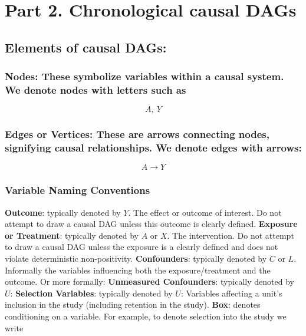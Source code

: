 \documentclass[
  singlecolumn]{report}
\begin{document}
\hypertarget{part-2.-chronological-causal-dags}{%
\section{Part 2. Chronological causal
DAGs}\label{part-2.-chronological-causal-dags}}

\hypertarget{elements-of-causal-dags}{%
\subsection{Elements of causal DAGs:}\label{elements-of-causal-dags}}

\hypertarget{nodes-these-symbolize-variables-within-a-causal-system.-we-denote-nodes-with-letters-such-as}{%
\subsubsection{\texorpdfstring{\textbf{Nodes:} These symbolize variables
within a causal system. We denote nodes with letters such
as}{Nodes: These symbolize variables within a causal system. We denote nodes with letters such as}}\label{nodes-these-symbolize-variables-within-a-causal-system.-we-denote-nodes-with-letters-such-as}}

\[
A, ~ Y
\]

\hypertarget{edges-or-vertices-these-are-arrows-connecting-nodes-signifying-causal-relationships.-we-denote-edges-with-arrows}{%
\subsubsection{\texorpdfstring{\textbf{Edges or Vertices:} These are
arrows connecting nodes, signifying causal relationships. We denote
edges with
arrows:}{Edges or Vertices: These are arrows connecting nodes, signifying causal relationships. We denote edges with arrows:}}\label{edges-or-vertices-these-are-arrows-connecting-nodes-signifying-causal-relationships.-we-denote-edges-with-arrows}}

\[
   A \to Y
\]

\hypertarget{variable-naming-conventions}{%
\subsubsection{\texorpdfstring{\textbf{Variable Naming
Conventions}}{Variable Naming Conventions}}\label{variable-naming-conventions}}

\textbf{Outcome}: typically denoted by \(Y\). The effect or outcome of
interest. Do not attempt to draw a causal DAG unless this outcome is
clearly defined. \textbf{Exposure or Treatment}: typically denoted by
\(A\) or \(X\). The intervention. Do not attempt to draw a causal DAG
unless the exposure is a clearly defined and does not violate
deterministic non-positivity. \textbf{Confounders}: typically denoted by
\(C\) or \(L\). Informally the variables influencing both the
exposure/treatment and the outcome. Or more formally: \textbf{Unmeasured
Confounders}: typically denoted by \(U\): \textbf{Selection Variables}:
typically denoted by \(U\): Variables affecting a unit's inclusion in
the study (including retention in the study). \textbf{Box}: denotes
conditioning on a variable. For example, to denote selection into the
study we write
\end{document}
